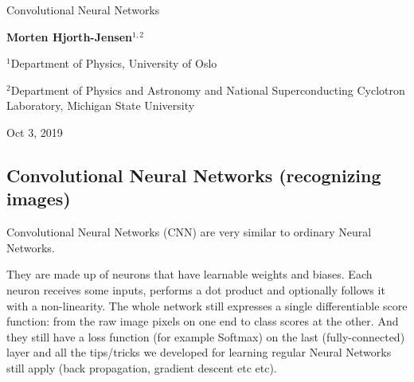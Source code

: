 \documentclass[%
oneside,                 %
final,                   %
10pt]{article}
\begin{document}

\newcommand{\exercisesection}[1]{\subsection*{#1}}






\thispagestyle{empty}

\begin{center}
{\LARGE\bf
\begin{spacing}{1.25}
Convolutional Neural Networks
\end{spacing}
}
\end{center}


\begin{center}
{\bf Morten Hjorth-Jensen${}^{1, 2}$} \\ [0mm]
\end{center}

\begin{center}
\centerline{{\small ${}^1$Department of Physics, University of Oslo}}
\centerline{{\small ${}^2$Department of Physics and Astronomy and National Superconducting Cyclotron Laboratory, Michigan State University}}
\end{center}
    

\begin{center}
Oct 3, 2019
\end{center}

\vspace{1cm}


\subsection{Convolutional Neural Networks (recognizing images)}

Convolutional Neural Networks (CNN) are very similar to ordinary Neural Networks.

They are made up of neurons that have learnable weights and
biases. Each neuron receives some inputs, performs a dot product and
optionally follows it with a non-linearity. The whole network still
expresses a single differentiable score function: from the raw image
pixels on one end to class scores at the other. And they still have a
loss function (for example Softmax) on the last (fully-connected) layer
and all the tips/tricks we developed for learning regular Neural
Networks still apply (back propagation, gradient descent etc etc).
\end{document}
